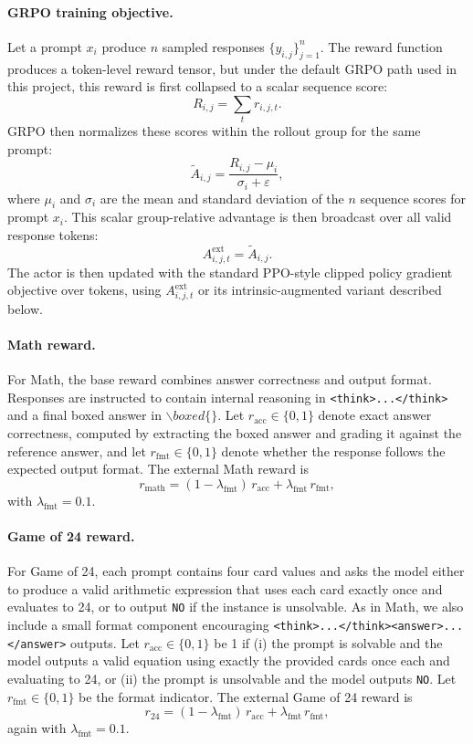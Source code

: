 \paragraph{GRPO training objective.}
Let a prompt \(x_i\) produce \(n\) sampled responses \(\{y_{i,j}\}_{j=1}^n\). The reward function produces a token-level reward tensor, but under the default GRPO path used in this project, this reward is first collapsed to a scalar sequence score:
\[
R_{i,j} = \sum_t r_{i,j,t}.
\]
GRPO then normalizes these scores within the rollout group for the same prompt:
\[
\tilde{A}_{i,j} = \frac{R_{i,j} - \mu_i}{\sigma_i + \varepsilon},
\]
where \(\mu_i\) and \(\sigma_i\) are the mean and standard deviation of the \(n\) sequence scores for prompt \(x_i\). This scalar group-relative advantage is then broadcast over all valid response tokens:
\[
A^{\mathrm{ext}}_{i,j,t} = \tilde{A}_{i,j}.
\]
The actor is then updated with the standard PPO-style clipped policy gradient objective over tokens, using \(A^{\mathrm{ext}}_{i,j,t}\) or its intrinsic-augmented variant described below.

\paragraph{Math reward.}
For Math, the base reward combines answer correctness and output format. Responses are instructed to contain internal reasoning in \texttt{<think>...</think>} and a final boxed answer in \(\backslash boxed\{\}\). Let \(r_{\mathrm{acc}}\in\{0,1\}\) denote exact answer correctness, computed by extracting the boxed answer and grading it against the reference answer, and let \(r_{\mathrm{fmt}}\in\{0,1\}\) denote whether the response follows the expected output format. The external Math reward is
\[
r_{\mathrm{math}} = (1-\lambda_{\mathrm{fmt}})\, r_{\mathrm{acc}} + \lambda_{\mathrm{fmt}}\, r_{\mathrm{fmt}},
\]
with \(\lambda_{\mathrm{fmt}} = 0.1\).

\paragraph{Game of 24 reward.}
For Game of 24, each prompt contains four card values and asks the model either to produce a valid arithmetic expression that uses each card exactly once and evaluates to 24, or to output \texttt{NO} if the instance is unsolvable. As in Math, we also include a small format component encouraging \texttt{<think>...</think><answer>...</answer>} outputs. Let \(r_{\mathrm{acc}}\in\{0,1\}\) be 1 if (i) the prompt is solvable and the model outputs a valid equation using exactly the provided cards once each and evaluating to 24, or (ii) the prompt is unsolvable and the model outputs \texttt{NO}. Let \(r_{\mathrm{fmt}}\in\{0,1\}\) be the format indicator. The external Game of 24 reward is
\[
r_{24} = (1-\lambda_{\mathrm{fmt}})\, r_{\mathrm{acc}} + \lambda_{\mathrm{fmt}}\, r_{\mathrm{fmt}},
\]
again with \(\lambda_{\mathrm{fmt}} = 0.1\).

